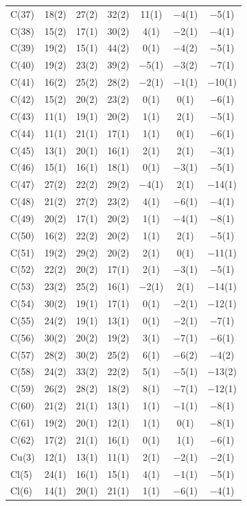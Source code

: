 \begin{center}
{\begin{supertabular}{lcccccc}
C(37)&18(2) &27(2)&32(2) &11(1)&$-$4(1) &$-$5(1)\\
C(38)&15(2) &17(1)&30(2) &4(1)&$-$2(1) &$-$4(1)\\
C(39)&19(2) &15(1)&44(2) &0(1)&$-$4(2) &$-$5(1)\\
C(40)&19(2) &23(2)&39(2) &$-$5(1)&$-$3(2) &$-$7(1)\\
C(41)&16(2) &25(2)&28(2) &$-$2(1)&$-$1(1) &$-$10(1)\\
C(42)&15(2) &20(2)&23(2) &0(1)&0(1) &$-$6(1)\\
C(43)&11(1) &19(1)&20(2) &1(1)&2(1) &$-$5(1)\\
C(44)&11(1) &21(1)&17(1) &1(1)&0(1) &$-$6(1)\\
C(45)&13(1) &20(1)&16(1) &2(1)&2(1) &$-$3(1)\\
C(46)&15(1) &16(1)&18(1) &0(1)&$-$3(1) &$-$5(1)\\
C(47)&27(2) &22(2)&29(2) &$-$4(1)&2(1) &$-$14(1)\\
C(48)&21(2) &27(2)&23(2) &4(1)&$-$6(1) &$-$4(1)\\
C(49)&20(2) &17(1)&20(2) &1(1)&$-$4(1) &$-$8(1)\\
C(50)&16(2) &22(2)&20(2) &1(1)&2(1) &$-$5(1)\\
C(51)&19(2) &29(2)&20(2) &2(1)&0(1) &$-$11(1)\\
C(52)&22(2) &20(2)&17(1) &2(1)&$-$3(1) &$-$5(1)\\
C(53)&23(2) &25(2)&16(1) &$-$2(1)&2(1) &$-$14(1)\\
C(54)&30(2) &19(1)&17(1) &0(1)&$-$2(1) &$-$12(1)\\
C(55)&24(2) &19(1)&13(1) &0(1)&$-$2(1) &$-$7(1)\\
C(56)&30(2) &20(2)&19(2) &3(1)&$-$7(1) &$-$6(1)\\
C(57)&28(2) &30(2)&25(2) &6(1)&$-$6(2) &$-$4(2)\\
C(58)&24(2) &33(2)&22(2) &5(1)&$-$5(1) &$-$13(2)\\
C(59)&26(2) &28(2)&18(2) &8(1)&$-$7(1) &$-$12(1)\\
C(60)&21(2) &21(1)&13(1) &1(1)&$-$1(1) &$-$8(1)\\
C(61)&19(2) &20(1)&12(1) &1(1)&0(1) &$-$8(1)\\
C(62)&17(2) &21(1)&16(1) &0(1)&1(1) &$-$6(1)\\
Cu(3)&12(1) &13(1)&11(1) &2(1)&$-$2(1) &$-$2(1)\\
Cl(5)&24(1) &16(1)&15(1) &4(1)&$-$1(1) &$-$5(1)\\
Cl(6)&14(1) &20(1)&21(1) &1(1)&$-$6(1) &$-$4(1)\\

\end{supertabular}}
\end{center}
